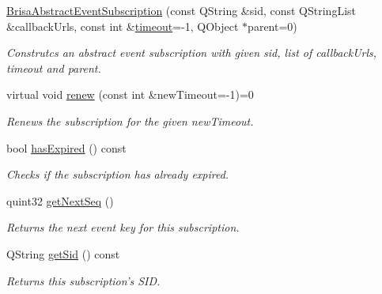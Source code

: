 \begin{DoxyCompactItemize}
\item 
\hyperlink{classBrisaUpnp_1_1BrisaAbstractEventSubscription_a80c65fb0f14a6a1e38a89d3614bcc904}{BrisaAbstractEventSubscription} (const QString \&sid, const QStringList \&callbackUrls, const int \&\hyperlink{classBrisaUpnp_1_1BrisaAbstractEventSubscription_afb99d42e318e002acc44740a2ca7881a}{timeout}=-\/1, QObject $\ast$parent=0)
\begin{DoxyCompactList}\small\item\em Construtcs an abstract event subscription with given {\itshape sid\/}, list of {\itshape callbackUrls\/}, {\itshape timeout\/} and {\itshape parent\/}. \item\end{DoxyCompactList}\item 
virtual void \hyperlink{classBrisaUpnp_1_1BrisaAbstractEventSubscription_ae9da94244c6164b5759b8be21e03d42f}{renew} (const int \&newTimeout=-\/1)=0
\begin{DoxyCompactList}\small\item\em Renews the subscription for the given {\itshape newTimeout\/}. \item\end{DoxyCompactList}\item 
bool \hyperlink{classBrisaUpnp_1_1BrisaAbstractEventSubscription_aef4109da165b4a2120d92f2bc81ead16}{hasExpired} () const 
\begin{DoxyCompactList}\small\item\em Checks if the subscription has already expired. \item\end{DoxyCompactList}\item 
quint32 \hyperlink{classBrisaUpnp_1_1BrisaAbstractEventSubscription_ad5d46adee5a94c6cd533f56b47aa9e18}{getNextSeq} ()
\begin{DoxyCompactList}\small\item\em Returns the next event key for this subscription. \item\end{DoxyCompactList}\item 
QString \hyperlink{classBrisaUpnp_1_1BrisaAbstractEventSubscription_a568db6180782a15620432fd163b87f63}{getSid} () const 
\begin{DoxyCompactList}\small\item\em Returns this subscription's SID. \item\end{DoxyCompactList}\item 

\end{DoxyCompactItemize}
